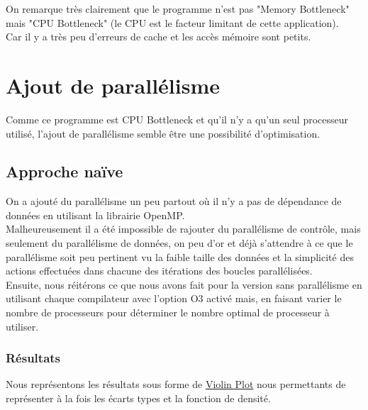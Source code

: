 \documentclass[
 aip,
 jmp,
 amsmath,amssymb,
 reprint
]{revtex4-1}
\begin{document}
On remarque très clairement que le programme n'est pas "Memory Bottleneck" mais "CPU Bottleneck" (le CPU est le facteur limitant de cette application).\\
Car il y a très peu d'erreurs de cache et les accès mémoire sont petits.

\section{Ajout de parallélisme}

Comme ce programme est CPU Bottleneck et qu'il n'y a qu'un seul processeur utilisé, l'ajout de parallélisme semble être une possibilité d'optimisation.

\subsection{Approche naïve}

On a ajouté du parallélisme un peu partout où il n'y a pas de dépendance de données en utilisant la librairie OpenMP.\\
Malheureusement il a été impossible de rajouter du parallélisme de contrôle, mais seulement du parallélisme de données, on peu d'or et déjà s'attendre à ce que le parallélisme soit peu pertinent vu la faible taille des données et la simplicité des actions effectuées dans chacune des itérations des boucles parallélisées.\\
Ensuite, nous réitérons ce que nous avons fait pour la version sans parallélisme en utilisant chaque compilateur avec l'option O3 activé mais, en faisant varier le nombre de processeurs pour déterminer le nombre optimal de processeur à utiliser.\\

\subsubsection{Résultats}

Nous représentons les résultats sous forme de \href{https://en.wikipedia.org/wiki/Violin_plot}{Violin Plot} nous permettants de représenter à la fois les écarts types et la fonction de densité.
\end{document}
